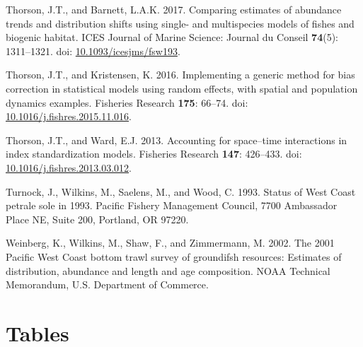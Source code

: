 \documentclass[12pt,]{article}
\begin{document}
\hypertarget{ref-thorson_comparing_2017}{}
Thorson, J.T., and Barnett, L.A.K. 2017. Comparing estimates of
abundance trends and distribution shifts using single- and multispecies
models of fishes and biogenic habitat. ICES Journal of Marine Science:
Journal du Conseil \textbf{74}(5): 1311--1321. doi:
\href{https://doi.org/10.1093/icesjms/fsw193}{10.1093/icesjms/fsw193}.

\hypertarget{ref-thorson_implementing_2016}{}
Thorson, J.T., and Kristensen, K. 2016. Implementing a generic method
for bias correction in statistical models using random effects, with
spatial and population dynamics examples. Fisheries Research
\textbf{175}: 66--74. doi:
\href{https://doi.org/10.1016/j.fishres.2015.11.016}{10.1016/j.fishres.2015.11.016}.

\hypertarget{ref-thorson_accounting_2013}{}
Thorson, J.T., and Ward, E.J. 2013. Accounting for space--time
interactions in index standardization models. Fisheries Research
\textbf{147}: 426--433. doi:
\href{https://doi.org/10.1016/j.fishres.2013.03.012}{10.1016/j.fishres.2013.03.012}.

\hypertarget{ref-turnock_status_1993}{}
Turnock, J., Wilkins, M., Saelens, M., and Wood, C. 1993. Status of West
Coast petrale sole in 1993. Pacific Fishery Management Council, 7700
Ambassador Place NE, Suite 200, Portland, OR 97220.

\hypertarget{ref-weinberg_2001_2002}{}
Weinberg, K., Wilkins, M., Shaw, F., and Zimmermann, M. 2002. The 2001
Pacific West Coast bottom trawl survey of groundifsh resources:
Estimates of distribution, abundance and length and age composition.
NOAA Technical Memorandum, U.S. Department of Commerce.

\newpage

\section{Tables}\label{tables}
\end{document}

